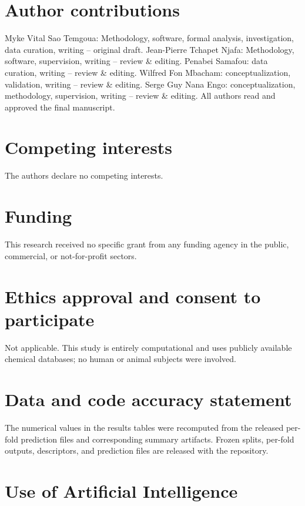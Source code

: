 \documentclass[11pt,a4paper]{article}
\begin{document}
\section*{Author contributions}

Myke Vital Sao Temgoua: Methodology, software, formal analysis, investigation, data curation, writing -- original draft. Jean-Pierre Tchapet Njafa: Methodology, software, supervision, writing -- review \& editing. Penabei Samafou: data curation, writing -- review \& editing. Wilfred Fon Mbacham: conceptualization, validation, writing -- review \& editing. Serge Guy Nana Engo: conceptualization, methodology, supervision, writing -- review \& editing. All authors read and approved the final manuscript.

\section*{Competing interests}

The authors declare no competing interests.

\section*{Funding}

This research received no specific grant from any funding agency in the public, commercial, or not-for-profit sectors.

\section*{Ethics approval and consent to participate}

Not applicable. This study is entirely computational and uses publicly available chemical databases; no human or animal subjects were involved.

\section*{Data and code accuracy statement}

The numerical values in the results tables were recomputed from the released per-fold prediction files and corresponding summary artifacts. Frozen splits, per-fold outputs, descriptors, and prediction files are released with the repository.

\section*{Use of Artificial Intelligence}
\end{document}
